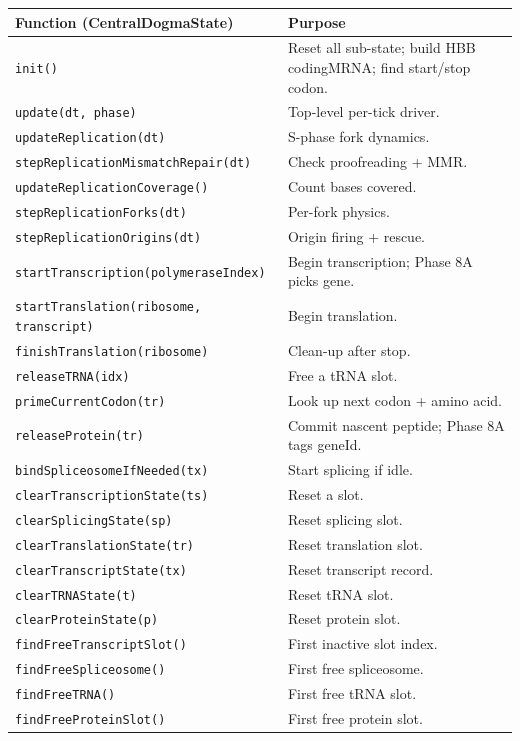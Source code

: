 \documentclass[11pt,letterpaper,twoside,openany]{book}
\newcommand{\code}[1]{\texttt{#1}}
\begin{document}
\begin{longtable}{p{5.5cm}p{8.0cm}}
\toprule
\textbf{Function (CentralDogmaState)} & \textbf{Purpose}\\ \midrule
\code{init()} & Reset all sub-state; build HBB codingMRNA; find start/stop codon.\\
\code{update(dt, phase)} & Top-level per-tick driver.\\
\code{updateReplication(dt)} & S-phase fork dynamics.\\
\code{stepReplicationMismatchRepair(dt)} & Check proofreading + MMR.\\
\code{updateReplicationCoverage()} & Count bases covered.\\
\code{stepReplicationForks(dt)} & Per-fork physics.\\
\code{stepReplicationOrigins(dt)} & Origin firing + rescue.\\
\code{startTranscription(polymeraseIndex)} & Begin transcription; Phase 8A picks gene.\\
\code{startTranslation(ribosome, transcript)} & Begin translation.\\
\code{finishTranslation(ribosome)} & Clean-up after stop.\\
\code{releaseTRNA(idx)} & Free a tRNA slot.\\
\code{primeCurrentCodon(tr)} & Look up next codon + amino acid.\\
\code{releaseProtein(tr)} & Commit nascent peptide; Phase 8A tags geneId.\\
\code{bindSpliceosomeIfNeeded(tx)} & Start splicing if idle.\\
\code{clearTranscriptionState(ts)} & Reset a slot.\\
\code{clearSplicingState(sp)} & Reset splicing slot.\\
\code{clearTranslationState(tr)} & Reset translation slot.\\
\code{clearTranscriptState(tx)} & Reset transcript record.\\
\code{clearTRNAState(t)} & Reset tRNA slot.\\
\code{clearProteinState(p)} & Reset protein slot.\\
\code{findFreeTranscriptSlot()} & First inactive slot index.\\
\code{findFreeSpliceosome()} & First free spliceosome.\\
\code{findFreeTRNA()} & First free tRNA slot.\\
\code{findFreeProteinSlot()} & First free protein slot.\\

\end{longtable}
\end{document}
